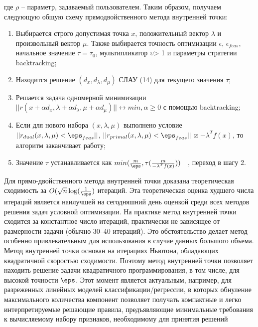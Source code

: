 \documentclass[12pt,a4paper]{article}
\begin{document}
	где $\rho$ – параметр, задаваемый пользователем. Таким образом, получаем следующую общую схему прямодвойственного метода внутренней точки:
	\begin{enumerate}
		\item Выбирается строго допустимая точка $x$, положительный вектор $\lambda$ и произвольный вектор $\mu$. Также выбирается точность оптимизации $\epsilon$, $\epsilon_{feas}$, начальное значение $\tau=\tau_0$, мультипликатор $\upsilon$> 1 и параметры
		стратегии backtracking;
		\item Находится решение $(d_x, d_\lambda, d_\mu)$ СЛАУ (14) для текущего значения $\tau$;
		\item Решается задача одномерной минимизации $	||r(x + \alpha d_x, \lambda +\alpha d_\lambda, \mu + \alpha d_\mu)|| \longleftrightarrow min, \alpha \geq 0$	с помощью backtracking;
		\item  Если для нового набора $(x, \lambda, \mu)$ выполнено условие $||r_{dual} (x, \lambda, \mu) < \eps_{feas}||$, $||r_{primal} (x, \lambda, \mu) < \eps_{feas}||$ и $-\lambda^Tf(x)$, то алгоритм заканчивает работу;
		\item Значение $\tau$ устанавливается как $min(\frac{m}{\eps}, \tau(\frac{m}{-\lambda^Tf(x)}))$		
		, переход в шагу 2.
	\end{enumerate}


Для прямо-двойственного метода внутренней точки доказана теоретическая сходимость за $O(\sqrt{n}\log(\frac{1}{\eps})$
итераций. Эта теоретическая оценка худшего числа итераций является наилучшей на сегодняшний день оценкой
среди всех методов решения задач условной оптимизации. На практике метод внутренней точки сходится за
константное число итераций, практически не зависящее от размерности задачи (обычно 30–40 итераций). Это
обстоятельство делает метод особенно привлекательным для использования в случае данных большого объема.
Метод внутренней точки основан на итерациях Ньютона, обладающих квадратичной скоростью сходимости.
Поэтому метод внутренней точки позволяет находить решение задачи квадратичного программирования, в том числе, для высокой точности $\eps$.
Этот момент является актуальным, например, для разреженных линейных моделей классификации/регрессии,
в которых обнуление максимального количества компонент позволяет получать компактные и легко интерпретируемые решающие правила, предъявляющие минимальные требования к вычисляемому набору признаков,
необходимому для принятия решений
\end{document}
